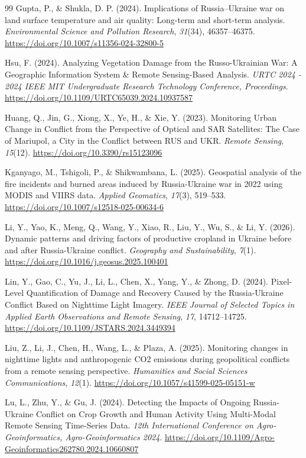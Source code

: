 \documentclass[12pt, a4paper]{article}
\begin{document}
\begin{thebibliography}{99}
Gupta, P., \& Shukla, D. P. (2024). Implications of Russia–Ukraine war on land surface temperature and air quality: Long-term and short-term analysis. \textit{Environmental Science and Pollution Research}, \textit{31}(34), 46357--46375. \url{https://doi.org/10.1007/s11356-024-32800-5}

Hsu, F. (2024). Analyzing Vegetation Damage from the Russo-Ukrainian War: A Geographic Information System & Remote Sensing-Based Analysis. \textit{URTC 2024 - 2024 IEEE MIT Undergraduate Research Technology Conference, Proceedings}. \url{https://doi.org/10.1109/URTC65039.2024.10937587}

Huang, Q., Jin, G., Xiong, X., Ye, H., \& Xie, Y. (2023). Monitoring Urban Change in Conflict from the Perspective of Optical and SAR Satellites: The Case of Mariupol, a City in the Conflict between RUS and UKR. \textit{Remote Sensing}, \textit{15}(12). \url{https://doi.org/10.3390/rs15123096}

Kganyago, M., Tshigoli, P., \& Shikwambana, L. (2025). Geospatial analysis of the fire incidents and burned areas induced by Russia-Ukraine war in 2022 using MODIS and VIIRS data. \textit{Applied Geomatics}, \textit{17}(3), 519--533. \url{https://doi.org/10.1007/s12518-025-00634-6}

Li, Y., Yao, K., Meng, Q., Wang, Y., Xiao, R., Liu, Y., Wu, S., \& Li, Y. (2026). Dynamic patterns and driving factors of productive cropland in Ukraine before and after Russia-Ukraine conflict. \textit{Geography and Sustainability}, \textit{7}(1). \url{https://doi.org/10.1016/j.geosus.2025.100401}

Lin, Y., Gao, C., Yu, J., Li, L., Chen, X., Yang, Y., \& Zhong, D. (2024). Pixel-Level Quantification of Damage and Recovery Caused by the Russia-Ukraine Conflict Based on Nighttime Light Imagery. \textit{IEEE Journal of Selected Topics in Applied Earth Observations and Remote Sensing}, \textit{17}, 14712--14725. \url{https://doi.org/10.1109/JSTARS.2024.3449394}

Liu, Z., Li, J., Chen, H., Wang, L., \& Plaza, A. (2025). Monitoring changes in nighttime lights and anthropogenic CO2 emissions during geopolitical conflicts from a remote sensing perspective. \textit{Humanities and Social Sciences Communications}, \textit{12}(1). \url{https://doi.org/10.1057/s41599-025-05151-w}

Lu, L., Zhu, Y., \& Gu, J. (2024). Detecting the Impacts of Ongoing Russia-Ukraine Conflict on Crop Growth and Human Activity Using Multi-Modal Remote Sensing Time-Series Data. \textit{12th International Conference on Agro-Geoinformatics, Agro-Geoinformatics 2024}. \url{https://doi.org/10.1109/Agro-Geoinformatics262780.2024.10660807}


\end{thebibliography}
\end{document}
